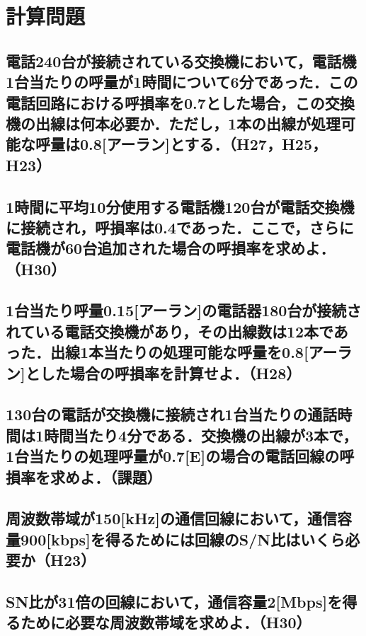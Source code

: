\newpage
\section{計算問題}
\subsection{電話240台が接続されている交換機において，電話機1台当たりの呼量が1時間について6分であった．この電話回路における呼損率を0.7とした場合，この交換機の出線は何本必要か．ただし，1本の出線が処理可能な呼量は0.8[アーラン]とする．（H27，H25，H23）}
\vspace{7cm}

\subsection{1時間に平均10分使用する電話機120台が電話交換機に接続され，呼損率は0.4であった．ここで，さらに電話機が60台追加された場合の呼損率を求めよ．（H30）}
\vspace{7cm}

\subsection{1台当たり呼量0.15[アーラン]の電話器180台が接続されている電話交換機があり，その出線数は12本であった．出線1本当たりの処理可能な呼量を0.8[アーラン]とした場合の呼損率を計算せよ．（H28）}
\vspace{7cm}

\newpage
\subsection{130台の電話が交換機に接続され1台当たりの通話時間は1時間当たり4分である．交換機の出線が3本で，1台当たりの処理呼量が0.7[E]の場合の電話回線の呼損率を求めよ．（課題）}
\vspace{7cm}

\subsection{周波数帯域が150[kHz]の通信回線において，通信容量900[kbps]を得るためには回線のS/N比はいくら必要か（H23）}
\vspace{7cm}

\subsection{SN比が31倍の回線において，通信容量2[Mbps]を得るために必要な周波数帯域を求めよ．（H30）}
\vspace{7cm}


